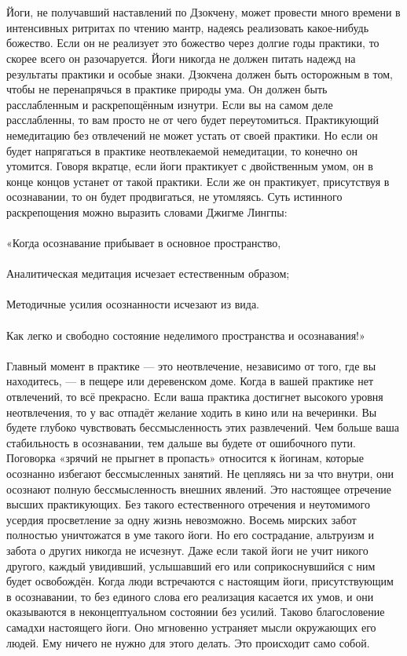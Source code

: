 \\ \\ Йоги, не получавший наставлений по Дзокчену, может провести много времени в интенсивных ритритах по чтению мантр, надеясь реализовать какое-нибудь божество. Если он не реализует это божество через долгие годы практики, то скорее всего он разочаруется. Йоги никогда не должен питать надежд на результаты практики и особые знаки. Дзокчена должен быть осторожным в том, чтобы не перенапрячься в практике природы ума. Он должен быть расслабленным и раскрепощённым изнутри. Если вы на самом деле расслабленны, то вам просто не от чего будет переутомиться. Практикующий немедитацию без отвлечений не может устать от своей практики. Но если он будет напрягаться в практике неотвлекаемой немедитации, то конечно он утомится. Говоря вкратце, если йоги практикует с двойственным умом, он в конце концов устанет от такой практики. Если же он практикует, присутствуя в осознавании, то он будет продвигаться, не утомляясь. Суть истинного раскрепощения можно выразить словами Джигме Лингпы:
\\ \\  «Когда осознавание прибывает в основное пространство, 
\\ \\ Аналитическая медитация исчезает естественным образом; 
\\ \\ Методичные усилия осознанности исчезают из вида. 
\\ \\ Как легко и свободно состояние неделимого пространства и осознавания!»
\\ \\ Главный момент в практике — это неотвлечение, независимо от того, где вы находитесь, — в пещере или деревенском доме. Когда в вашей практике нет отвлечений, то всё прекрасно. Если ваша практика достигнет высокого уровня неотвлечения, то у вас отпадёт желание ходить в кино или на вечеринки. Вы будете глубоко чувствовать бессмысленность этих развлечений. Чем больше ваша стабильность в осознавании, тем дальше вы будете от ошибочного пути. Поговорка «зрячий не прыгнет в пропасть» относится к йогинам, которые осознанно избегают бессмысленных занятий. Не цепляясь ни за что внутри, они осознают полную бессмысленность внешних явлений. Это настоящее отречение высших практикующих. Без такого естественного отречения и неутомимого усердия просветление за одну жизнь невозможно. Восемь мирских забот полностью уничтожатся в уме такого йоги. Но его сострадание, альтруизм и забота о других никогда не исчезнут. Даже если такой йоги не учит никого другого, каждый увидивший, услышавший его или соприкоснувшийся с ним будет освобождён. Когда люди встречаются с настоящим йоги, присутствующим в осознавании, то без единого слова его реализация касается их умов, и они оказываются в неконцептуальном состоянии без усилий. Таково благословение самадхи настоящего йоги. Оно мгновенно устраняет мысли окружающих его людей. Ему ничего не нужно для этого делать. Это происходит само собой.
